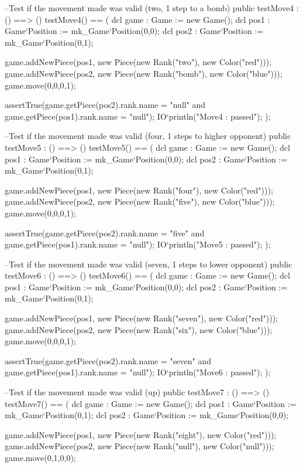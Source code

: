 \begin{vdm_al}
  --Test if the movement made was valid (two, 1 step to a bomb)
  public testMove4 : () ==> ()
   testMove4() ==
   (
    dcl game : Game := new Game();
    dcl pos1 : Game`Position := mk_Game`Position(0,0);
    dcl pos2 : Game`Position := mk_Game`Position(0,1);
    
    game.addNewPiece(pos1, new Piece(new Rank("two"), new Color("red")));
    game.addNewPiece(pos2, new Piece(new Rank("bomb"), new Color("blue")));
    game.move(0,0,0,1);
    
    assertTrue(game.getPiece(pos2).rank.name = "null" and game.getPiece(pos1).rank.name = "null");
    IO`println("Move4 : passed");
   );
  
  --Test if the movement made was valid (four, 1 steps to higher opponent)
  public testMove5 : () ==> ()
   testMove5() ==
   (
    dcl game : Game := new Game();
    dcl pos1 : Game`Position := mk_Game`Position(0,0);
    dcl pos2 : Game`Position := mk_Game`Position(0,1);
    
    game.addNewPiece(pos1, new Piece(new Rank("four"), new Color("red")));
    game.addNewPiece(pos2, new Piece(new Rank("five"), new Color("blue")));
    game.move(0,0,0,1);
    
    assertTrue(game.getPiece(pos2).rank.name = "five" and game.getPiece(pos1).rank.name = "null");
    IO`println("Move5 : passed");
   );
  
  --Test if the movement made was valid (seven, 1 steps to lower opponent)
  public testMove6 : () ==> ()
   testMove6() ==
   (
    dcl game : Game := new Game();
    dcl pos1 : Game`Position := mk_Game`Position(0,0);
    dcl pos2 : Game`Position := mk_Game`Position(0,1);
    
    game.addNewPiece(pos1, new Piece(new Rank("seven"), new Color("red")));
    game.addNewPiece(pos2, new Piece(new Rank("six"), new Color("blue")));
    game.move(0,0,0,1);
    
    assertTrue(game.getPiece(pos2).rank.name = "seven" and game.getPiece(pos1).rank.name = "null");
    IO`println("Move6 : passed");
   );
  
  --Test if the movement made was valid (up) 
  public testMove7 : () ==> ()
   testMove7() ==
   (
    dcl game : Game := new Game();
    dcl pos1 : Game`Position := mk_Game`Position(0,1);
    dcl pos2 : Game`Position := mk_Game`Position(0,0);
    
    game.addNewPiece(pos1, new Piece(new Rank("eight"), new Color("red")));
    game.addNewPiece(pos2, new Piece(new Rank("null"), new Color("null")));
    game.move(0,1,0,0);
    

\end{vdm_al}
